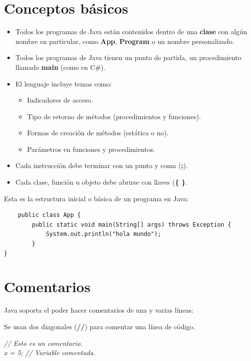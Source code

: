 \section{Conceptos básicos}
\begin{itemize}
    \item Todos los programas de Java están contenidos dentro de una \textbf{clase} con algún nombre en particular, como \textbf{App}, \textbf{Program} o un nombre personalizado.
    \item Todos los programas de Java tienen un punto de partida, un procedimiento llamado \textbf{main} (como en C\#).
    \item El lenguaje incluye temas como:
    \begin{itemize}
        \item Indicadores de acceso.
        \item Tipo de retorno de métodos (procedimientos y funciones).
        \item Formas de creación de métodos (estática o no).
        \item Parámetros en funciones y procedimientos.
    \end{itemize}
    \item Cada instrucción debe terminar con un punto y coma (\textbf{;}).
    \item Cada clase, función u objeto debe abrirse con llaves (\textbf{\{ \}}.
\end{itemize}

Esta es la estructura inicial o básica de un programa en Java:
\begin{lstlisting}
    public class App {
        public static void main(String[] args) throws Exception {
            System.out.println("hola mundo");
        }
}
\end{lstlisting}



\section{Comentarios}
\hspace{0.55cm}Java soporta el poder hacer comentarios de una y varias líneas:

Se usan dos diagonales (\textbf{//}) para comentar una línea de código.
\begin{center}
	\textit{
		// Esto es un comentario. \\
		x = 5; // Variable comentada.
	}
\end{center}

